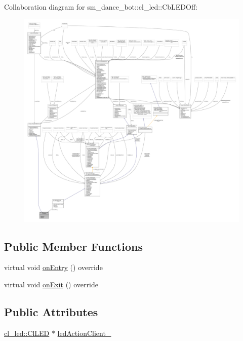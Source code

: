 Collaboration diagram for sm\+\_\+dance\+\_\+bot\+:\+:cl\+\_\+led\+:\+:Cb\+L\+E\+D\+Off\+:\nopagebreak
\begin{figure}[H]
\begin{center}
\leavevmode
\includegraphics[width=350pt]{classsm__dance__bot_1_1cl__led_1_1CbLEDOff__coll__graph}
\end{center}
\end{figure}
\subsection*{Public Member Functions}
\begin{DoxyCompactItemize}
\item 
virtual void \hyperlink{classsm__dance__bot_1_1cl__led_1_1CbLEDOff_a3c0ed097db52baae1928a19936f09a83}{on\+Entry} () override
\item 
virtual void \hyperlink{classsm__dance__bot_1_1cl__led_1_1CbLEDOff_ad0db28985308dd486943d1f511c655ad}{on\+Exit} () override
\end{DoxyCompactItemize}
\subsection*{Public Attributes}
\begin{DoxyCompactItemize}
\item 
\hyperlink{classsm__dance__bot_1_1cl__led_1_1ClLED}{cl\+\_\+led\+::\+Cl\+L\+ED} $\ast$ \hyperlink{classsm__dance__bot_1_1cl__led_1_1CbLEDOff_a338a86c573b1b9c9cc4af9459145d68e}{led\+Action\+Client\+\_\+}
\end{DoxyCompactItemize}


